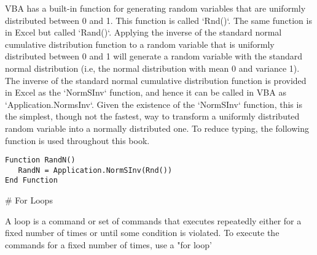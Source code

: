 VBA has a built-in function for generating random variables that are
uniformly distributed between 0 and 1. This function is called `Rnd()`.
The same function is in Excel but called `Rand()`. Applying the inverse
of the standard normal cumulative distribution function to a random
variable that is uniformly distributed between 0 and 1 will generate a
random variable with the standard normal distribution (i.e, the normal
distribution with mean 0 and variance 1). The inverse of the standard
normal cumulative distribution function is provided in Excel as the
`NormSInv` function, and hence it can be called in VBA as
`Application.NormsInv`. Given the existence of the `NormSInv` function,
this is the simplest, though not the fastest, way to transform a
uniformly distributed random variable into a normally distributed one.
To reduce typing, the following function is used throughout this book.


\small\begin{verbatim}
Function RandN()
   RandN = Application.NormSInv(Rnd())
End Function
\end{verbatim}\normalsize

# For Loops


A loop is a command or set of commands that executes repeatedly either
for a fixed number of times or until some condition is violated. To
execute the commands for a fixed number of times, use a "for loop'

